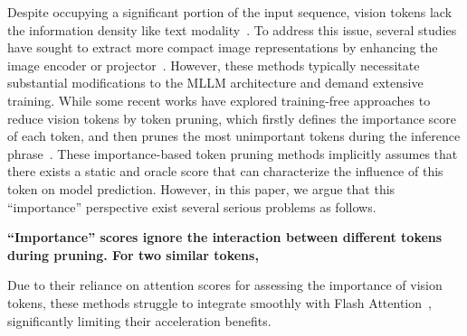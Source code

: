 Despite occupying a significant portion of the input sequence, vision tokens lack the information density like text modality~\citep{marr2010vision}.
To address this issue, several studies have sought to extract more compact image representations by enhancing the image encoder or projector~\citep{alayrac2022flamingo, li2023llama, instructblip, cha2024honeybee}.
However, these methods typically necessitate substantial modifications to the MLLM architecture and demand extensive training.
While some recent works have explored training-free approaches to reduce vision tokens by token pruning, which firstly defines the importance score of each token, and then prunes the most unimportant tokens during the inference phrase~\citep{chen2024image, zhang2024sparsevlm, liu2024multi}. 
These importance-based token pruning methods implicitly assumes that there exists a static and oracle score that can characterize the influence of this token on model prediction. However, in this paper, we argue that this ``importance'' perspective exist several serious problems as follows.

\textbf{``Importance'' scores ignore the interaction between different tokens during pruning. For two similar tokens, }







Due to their reliance on attention scores for assessing the importance of vision tokens, these methods struggle to integrate smoothly with Flash Attention~\citep{dao2022flashattention, dao2023flashattention2}, significantly limiting their acceleration benefits.

